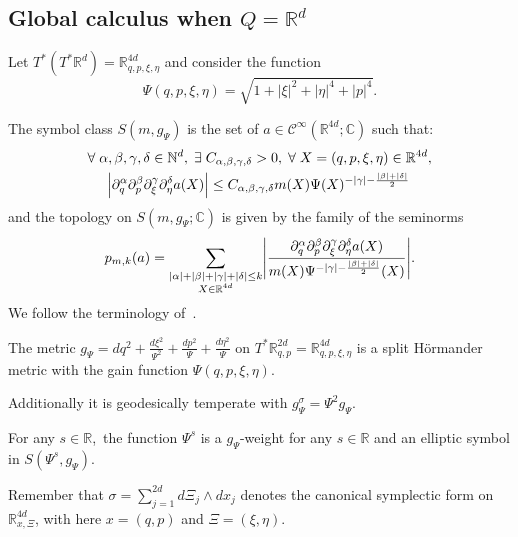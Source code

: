 \documentclass[10pt]{amsart}
\theoremstyle{definition}\newtheorem{defi}[theo]{Definition}\newtheorem{rema}[theo]{Remark}\newtheorem{exam}[theo]{Example}\newtheorem{exem}[theo]{Example}\newtheorem{nota}[theo]{Notation}
\newcommand{\C}{\mathbb{C}}
\newcommand{\R}{\mathbb{R}}
\newcommand{\N}{\mathbb{N}}
\newcommand{\clC}{\mathcal{C}}
\let\oldexists\exists
\renewcommand*{\exists}{\mathrel{\oldexists}}
\let\oldforall\forall
\renewcommand*{\forall}{\mathrel{\oldforall}}
\let\originalleft\left
\let\originalright\right
\renewcommand{\left}{\mathopen{}\mathclose\bgroup\originalleft}
\renewcommand{\right}{\aftergroup\egroup\originalright}
\begin{document}
\subsection{Global calculus when \texorpdfstring{$Q=\R^d$}{Q=R\^d}}\label{sec:globpseudodiff}

Let $T^{*}(T^{*}\R^{d})=\R^{4d}_{q,p,\xi,\eta}$ and consider the function
\[
\Psi(q,p,\xi,\eta)=\sqrt{1+|\xi|^{2}+|\eta|^{4}+|p|^{4}}.
\]

The symbol class $S(m,g_{\Psi})$ is the set of $a\in \clC^{\infty}(\R^{4d};\C)$ such that:
\begin{multline*}
\forall \alpha,\beta,\gamma,\delta\in \N^{d},\; \exists C_{\alpha,\beta,\gamma,\delta}>0,\; \forall X=(q,p,\xi,\eta)\in \R^{4d},\\
\left|\partial_{q}^{\alpha}\partial_{p}^{\beta}\partial_{\xi}^{\gamma}\partial_{\eta}^{\delta}a(X)\right|
\leq C_{\alpha,\beta,\gamma,\delta}m(X)\Psi(X)^{-|\gamma|-\frac{|\beta|+|\delta|}{2}}\,
\end{multline*}
and the topology on $S(m,g_{\Psi};\C)$ is given by the family of the seminorms
\[
p_{m,k}(a)=\sum_{\substack{|\alpha|+|\beta|+|\gamma|+|\delta|\leq k\\X\in \R^{4d}}}\left|\frac{\partial_{q}^{\alpha}\partial_{p}^{\beta}\partial_{\xi}^{\gamma}\partial_{\eta}^{\delta}a(X)}{m(X) \Psi^{-|\gamma|-\frac{|\beta|+|\delta|}{2}}(X)} \right|.
\]
We follow the terminology of~\cite{Bon}.
\begin{prop}\label{pr:Hormmetric}
The metric $g_{\Psi}=dq^{2}+\frac{d\xi^{2}}{\Psi^{2}}+\frac{dp^{2}}{\Psi}+\frac{d\eta^{2}}{\Psi}$ on $T^{*}\R^{2d}_{q,p}=\R^{4d}_{q,p,\xi,\eta}$ is a split H\"ormander metric with the gain function $\Psi(q,p,\xi,\eta)$.

Additionally it is geodesically temperate with $g^{\sigma}_{\Psi}=\Psi^{2}g_{\Psi}$.

For any $s\in \R$,\, the function $\Psi^{s}$ is a $g_{\Psi}$-weight for any $s\in \R$ and an elliptic symbol in $S(\Psi^{s},g_{\Psi})$.
\end{prop}

Remember that $\sigma=\sum_{j=1}^{2d}d\Xi_{j}\wedge dx_{j}$ denotes the canonical symplectic form on $\R^{4d}_{x,\Xi}$, with here $x=(q,p)$ and $\Xi=(\xi,\eta)$.
\end{document}
